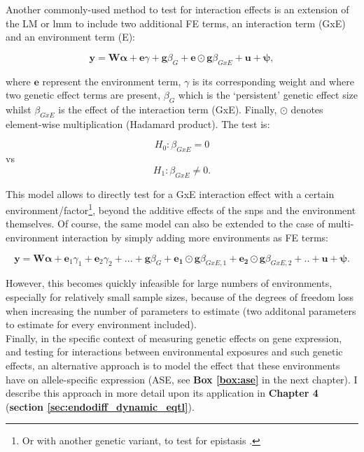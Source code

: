 Another commonly-used method to test for interaction effects is an extension of the LM or \gls{lmm} to include two additional FE terms, an interaction term (GxE) and an environment term (E):

\begin{equation}\label{eq:Interaction_test_FE_LMM}
 \mathbf{y} =  \mathbf{W}\boldsymbol{\alpha} + \mathbf{e}\gamma  + \mathbf{g}\beta_G + \mathbf{e}\odot\mathbf{g}\beta_{GxE} + \mathbf{u} + \boldsymbol{\psi}, 
\end{equation}

where $\mathbf{e}$ represent the environment term, $\gamma$ is its corresponding weight and where two genetic effect terms are present, $\beta_G$ which is the `persistent' genetic effect size whilst $\beta_{GxE}$ is the effect of the interaction term (GxE).
Finally, $\odot$ denotes element-wise multiplication (Hadamard product).
The test is:

\begin{equation}
 H_{0}: \beta_{GxE}=0 
\end{equation}
vs
\begin{equation}
 H_{1}: \beta_{GxE} \neq 0. 
\end{equation}

This model allows to directly test for a GxE interaction effect with a certain environment/factor\footnote{Or with another genetic variant, to test for epistasis \cite{wei2014detecting}.}, beyond the additive effects of the \gls{snp}s and the environment themselves. 
Of course, the same model can also be extended to the case of multi-environment interaction by simply adding more environments as FE terms:

\begin{equation}\label{eq:multi_interaction_test_FE_LMM}
 \mathbf{y} =  \mathbf{W}\boldsymbol{\alpha} + \mathbf{e}_1\gamma_1 + \mathbf{e}_2\gamma_2 + ...  + \mathbf{g}\beta_G + \mathbf{e_1}\odot\mathbf{g}\beta_{GxE,1}+ \mathbf{e_2}\odot\mathbf{g}\beta_{GxE,2} + .. + \mathbf{u} + \boldsymbol{\psi}. 
\end{equation}

However, this becomes quickly infeasible for large numbers of environments, especially for relatively small sample sizes, because of the degrees of freedom loss when increasing the number of parameters to estimate (two additonal parameters to estimate for every environment included). \\

Finally, in the specific context of measuring genetic effects on gene expression, and testing for interactions between environmental exposures and such genetic effects, an alternative approach is to model the effect that these environments have on allele-specific expression (ASE, see \textbf{Box \ref{box:ase}} in the next chapter).
I describe this approach in more detail upon its application in \textbf{Chapter 4} (\textbf{section \ref{sec:endodiff_dynamic_eqtl}}).


